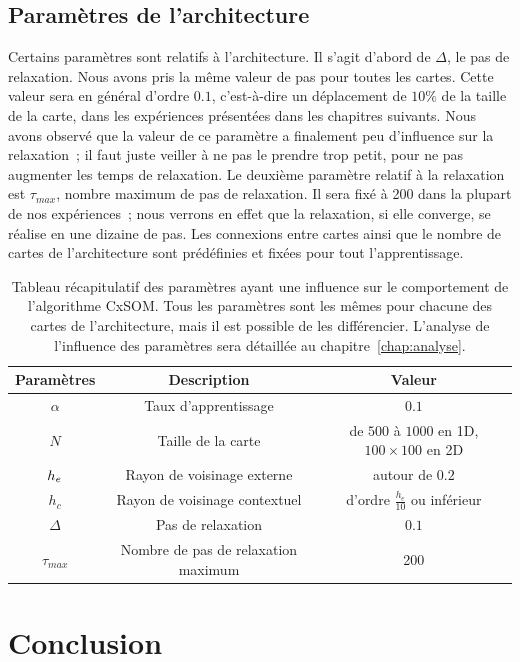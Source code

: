 \documentclass[../main]{subfiles}
\begin{document}
\subsection{Paramètres de l'architecture}

Certains paramètres sont relatifs à l'architecture. Il s'agit d'abord de $\Delta$, le pas de relaxation. Nous avons pris la même valeur de pas pour toutes les cartes. Cette valeur sera en général d'ordre $0.1$, c'est-à-dire un déplacement de $10\%$ de la taille de la carte, dans les expériences présentées dans les chapitres suivants. Nous avons observé que la valeur de ce paramètre a finalement peu d'influence sur la relaxation~; il faut juste veiller à ne pas le prendre trop petit, pour ne pas augmenter les temps de relaxation. Le deuxième paramètre relatif à la relaxation est $\tau_{max}$, nombre maximum de pas de relaxation. Il sera fixé à 200 dans la plupart de nos expériences~; nous verrons en effet que la relaxation, si elle converge, se réalise en une dizaine de pas.
Les connexions entre cartes ainsi que le nombre de cartes de l'architecture sont prédéfinies et fixées pour tout l'apprentissage.

\begin{table}
\caption{Tableau récapitulatif des paramètres ayant une influence sur le comportement de l'algorithme CxSOM. Tous les paramètres sont les mêmes pour chacune des cartes de l'architecture, mais il est possible de les différencier. L'analyse de l'influence des paramètres sera détaillée au chapitre~\ref{chap:analyse}.}\label{tab:params}
\vspace{3mm}
\begin{tabular}{|c|c|c|}
\hline
Paramètres & Description & Valeur \\
\hline
$\alpha$ & Taux d'apprentissage & $0.1$ \\
$N$ & Taille de la carte & de $500$ à $1000$ en 1D, $100 \times 100$ en 2D \\
$h_e$ & Rayon de voisinage externe & autour de $0.2$ \\
$h_c$ & Rayon de voisinage contextuel & d'ordre $\frac{h_e}{10}$ ou inférieur \\
$\Delta$ & Pas de relaxation & $0.1$ \\
$\tau_{max}$ & Nombre de pas de relaxation maximum & 200 \\
\hline
\end{tabular}
\end{table}


\section{Conclusion}
\end{document}

